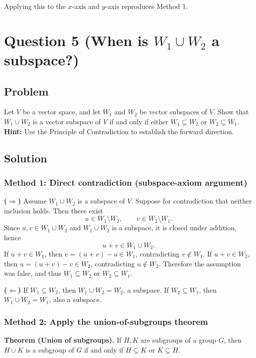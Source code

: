 \documentclass[12pt]{article}
\begin{document}
Applying this to the \(x\)-axis and \(y\)-axis reproduces Method 1.

\newpage
\section{Question 5 (When is \(W_1\cup W_2\) a subspace?)}
\subsection{Problem}
Let \(V\) be a vector space, and let \(W_1\) and \(W_2\) be vector subspaces of \(V\).
Show that \(W_1\cup W_2\) is a vector subspace of \(V\) if and only if either \(W_1\subseteq W_2\) or \(W_2\subseteq W_1\).
\newline
\textbf{Hint:} Use the Principle of Contradiction to establish the forward direction.

\subsection{Solution}
\subsubsection{Method 1: Direct contradiction (subspace-axiom argument)}
\textbf{(\(\Rightarrow\))} Assume \(W_1\cup W_2\) is a subspace of \(V\). Suppose for contradiction that neither inclusion holds.
Then there exist
\[
u\in W_1\setminus W_2,\qquad v\in W_2\setminus W_1.
\]
Since \(u,v\in W_1\cup W_2\) and \(W_1\cup W_2\) is a subspace, it is closed under addition, hence
\[
u+v\in W_1\cup W_2.
\]
If \(u+v\in W_1\), then \(v=(u+v)-u\in W_1\), contradicting \(v\notin W_1\).
If \(u+v\in W_2\), then \(u=(u+v)-v\in W_2\), contradicting \(u\notin W_2\).
Therefore the assumption was false, and thus \(W_1\subseteq W_2\) or \(W_2\subseteq W_1\).

\textbf{(\(\Leftarrow\))} If \(W_1\subseteq W_2\), then \(W_1\cup W_2=W_2\), a subspace. If \(W_2\subseteq W_1\), then
\(W_1\cup W_2=W_1\), also a subspace.

\subsubsection{Method 2: Apply the union-of-subgroups theorem}
\textbf{Theorem (Union of subgroups).} If \(H,K\) are subgroups of a group \(G\), then \(H\cup K\) is a subgroup of \(G\)
if and only if \(H\subseteq K\) or \(K\subseteq H\).
\end{document}
